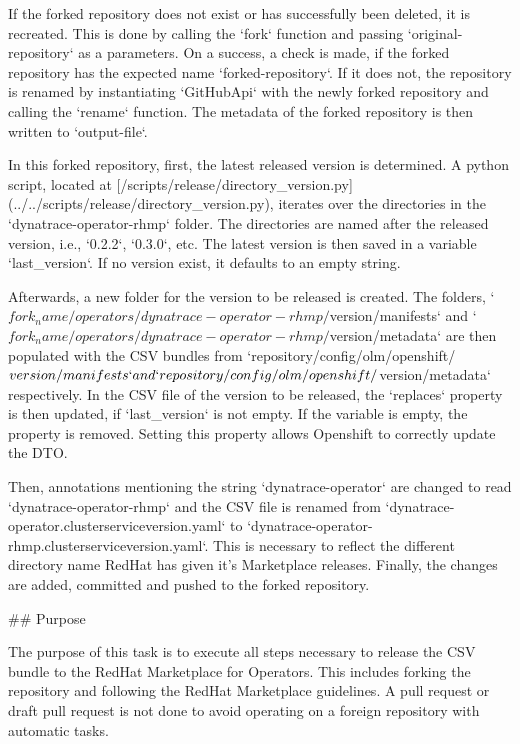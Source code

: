 If the forked repository does not exist or has successfully been deleted, it is recreated.
This is done by calling the `fork` function and passing `{original-repository}` as a parameters.
On a success, a check is made, if the forked repository has the expected name `{forked-repository}`.
If it does not, the repository is renamed by instantiating `GitHubApi` with the newly forked repository and calling the `rename` function.
The metadata of the forked repository is then written to `{output-file}`.

In this forked repository, first, the latest released version is determined.
A python script, located at [/scripts/release/directory_version.py](../../scripts/release/directory_version.py), iterates over the directories in the `dynatrace-operator-rhmp` folder.
The directories are named after the released version, i.e., `0.2.2`, `0.3.0`, etc.
The latest version is then saved in a variable `last_version`.
If no version exist, it defaults to an empty string.

Afterwards, a new folder for the version to be released is created.
The folders, `${fork_name}/operators/dynatrace-operator-rhmp/${version}/manifests` and `${fork_name}/operators/dynatrace-operator-rhmp/${version}/metadata` are then populated with the CSV bundles from `{repository}/config/olm/openshift/${version}/manifests` and `{repository}/config/olm/openshift/${version}/metadata` respectively.
In the CSV file of the version to be released, the `replaces` property is then updated, if `last_version` is not empty.
If the variable is empty, the property is removed.
Setting this property allows Openshift to correctly update the DTO.

Then, annotations mentioning the string `dynatrace-operator` are changed to read `dynatrace-operator-rhmp` and the CSV file is renamed from `dynatrace-operator.clusterserviceversion.yaml` to `dynatrace-operator-rhmp.clusterserviceversion.yaml`.
This is necessary to reflect the different directory name RedHat has given it's Marketplace releases.
Finally, the changes are added, committed and pushed to the forked repository.

## Purpose

The purpose of this task is to execute all steps necessary to release the CSV bundle to the RedHat Marketplace for Operators.
This includes forking the repository and following the RedHat Marketplace guidelines.
A pull request or draft pull request is not done to avoid operating on a foreign repository with automatic tasks.


